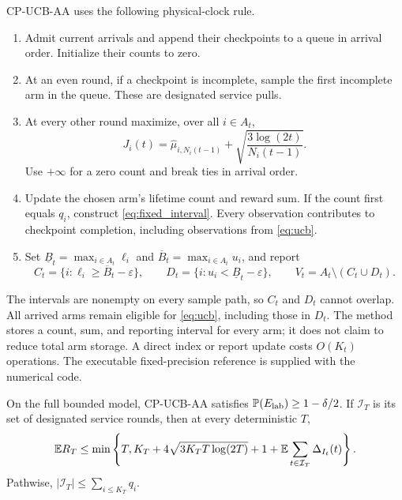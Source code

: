 \documentclass[11pt]{article}
\begin{document}
CP-UCB-AA uses the following physical-clock rule.
\begin{enumerate}
\item Admit current arrivals and append their checkpoints to a queue in arrival
order. Initialize their counts to zero.
\item At an even round, if a checkpoint is incomplete, sample the first
incomplete arm in the queue. These are designated service pulls.
\item At every other round maximize, over all $i\in A_t$,
\begin{equation}
 J_i(t)=\widehat\mu_{i,N_i(t-1)}+
             \sqrt{\frac{3\log(2t)}{N_i(t-1)}}.
 \label{eq:ucb}
\end{equation}
Use $+\infty$ for a zero count and break ties in arrival order.
\item Update the chosen arm's lifetime count and reward sum. If the count first
equals $q_i$, construct \eqref{eq:fixed_interval}. Every observation contributes
to checkpoint completion, including observations from \eqref{eq:ucb}.
\item Set $\underline B_t=\max_{i\in A_t}\ell_i$ and
$\overline B_t=\max_{i\in A_t}u_i$, and report
\begin{equation}
 C_t=\{i:\ell_i\ge\overline B_t-\varepsilon\},\qquad
 D_t=\{i:u_i<\underline B_t-\varepsilon\},\qquad
 V_t=A_t\setminus(C_t\cup D_t).
 \label{eq:reports}
\end{equation}
\end{enumerate}
The intervals are nonempty on every sample path, so $C_t$ and $D_t$ cannot
overlap. All arrived arms remain eligible for \eqref{eq:ucb}, including those
in $D_t$. The method stores a count, sum, and reporting interval for every arm;
it does not claim to reduce total arm storage. A direct index or report update
costs $O(K_t)$ operations. The executable fixed-precision reference is supplied
with the numerical code.

\begin{proposition}
\label{prop:reporting}
On the full bounded model, CP-UCB-AA satisfies
$\mathbb P(E_{\rm lab})\ge1-\delta/2$. If $\mathcal I_T$ is its set of designated
service rounds, then at every deterministic $T$,
\begin{equation}
 \mathbb E R_T\le\min\left\{T,K_T+4\sqrt{3K_TT\log(2T)}+1+
                \mathbb E\sum_{t\in\mathcal I_T}\Delta_{I_t}(t)\right\}.
 \label{eq:reward_bound}
\end{equation}
Pathwise, $|\mathcal I_T|\le\sum_{i\le K_T}q_i$.
\end{proposition}
\end{document}
